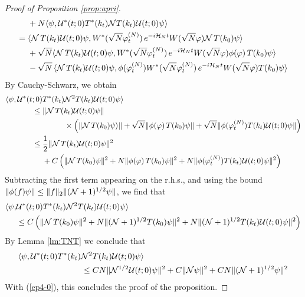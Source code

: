 \documentclass[11pt,a4paper,DIV11]{scrartcl}	%
\newcommand{\cU}{{\cal U}}
\newcommand{\cH}{{\cal H}}
\newcommand{\cN}{{\cal N}}
\begin{document}
\begin{proof}[Proof of Proposition \ref{prop:apri}]
\begin{equation}
\begin{split}
 &+ N  \langle \psi, \cU^* (t;0)  T^* (k_t) \cN T (k_t) \cU (t;0) \psi \rangle \\
 = \; &  \langle \cN \, T (k_t) \cU (t;0) \psi,  W^* (\sqrt{N} \varphi_t^{(N)}) \,  e^{-i \cH_N t} W (\sqrt{N} \varphi)  \cN \, T (k_0) \psi \rangle \\ &+\sqrt{N} \langle \cN \, T (k_t) \cU (t;0) \psi,  W^* (\sqrt{N} \varphi_t^{(N)}) \,  e^{-i \cH_N t} W (\sqrt{N} \varphi)  \phi (\varphi) \, T (k_0) \psi \rangle \\
 &-\sqrt{N} \, \langle \cN \, T (k_t) \cU (t;0) \psi,  \phi (\varphi_t^{(N)})  W^* (\sqrt{N} \varphi_t^{(N)}) \, e^{-i \cH_N t}  W (\sqrt{N} \varphi) T (k_0) \psi \rangle
\end{split} \end{equation}
By Cauchy-Schwarz, we obtain 
\[ \begin{split} 
\langle \psi , \cU^* (t;0) &T^* (k_t) \cN^2  T(k_t) \cU (t;0) \psi \rangle \\ \leq \; & \| \cN \, T (k_t) \cU (t;0) \psi \|\\ & \hspace{1cm} \times  \left(  \| \cN \, T (k_0) \psi \rangle \| + \sqrt{N} \| \phi (\varphi) \, T (k_0) \psi \| + \sqrt{N} \|  \phi (\varphi_t^{(N)}) T (k_t) \cU (t;0)  \psi \| \right) \\ \leq \; & \frac{1}{2} \| \cN \, T (k_t) \cU (t;0) \psi \|^2 \\ &+ C \left( \|
\cN \, T (k_0) \psi \|^2 + N \| \phi (\varphi) \, T (k_0) \psi \|^2 + N \|  \phi (\varphi_t^{(N)}) T (k_t) \cU (t;0)  \psi \|^2 \right) 
\end{split} \]
Subtracting the first term appearing on the r.h.s., and using the bound $\| \phi (f) \psi \| \leq \| f \|_2 \| (\cN+1)^{1/2} \psi \|$, we find that
\[ \begin{split} \langle \psi , & \cU^* (t;0) T^* (k_t) \cN^2  T(k_t) \cU (t;0) \psi \rangle \\ & \leq C \left( \|
\cN \, T(k_0)  \psi \|^2 + N \| (\cN+1)^{1/2} T(k_0) \psi \|^2 + N \| (\cN+1)^{1/2} T(k_t) \cU (t;0)  \psi \|^2 \right)  \end{split} \]
By Lemma \ref{lm:TNT} we conclude that 
\[ \begin{split} \langle \psi , \cU^* (t;0) T^* (k_t)  \cN^2 &T (k_t) \cU (t;0) \psi \rangle \\ \leq \; &C N  \| \cN^{1/2}  \cU (t;0) \psi \|^2 + C \| \cN \psi \|^2 + CN \| (\cN+1)^{1/2} \psi \|^2  \end{split} \]
With (\ref{ep4-0}), this concludes the proof of the proposition.
\end{proof}
\end{document}

